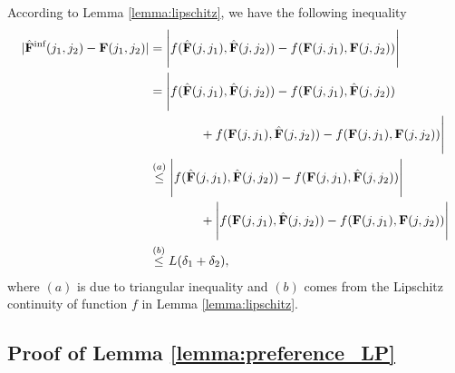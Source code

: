 \documentclass{article} %
\newcommand{\bF}{\mathbf{F}}
\begin{document}
{According to Lemma \ref{lemma:lipschitz}, we have the following inequality
\begin{align}
  |\hat{\bF}^{\text{inf}}(j_1, j_2)-\bF(j_1, j_2)|&=\Bigg|f(\hat{\bF}(j, j_1), \hat{\bF}(j,j_2))-f({\bF}(j, j_1), {\bF}(j,j_2))\Bigg|\nonumber\allowdisplaybreaks\\
  &=   \Bigg|f(\hat{\bF}(j, j_1), \hat{\bF}(j,j_2))-f({\bF}(j, j_1), \hat{\bF}(j,j_2))\nonumber\allowdisplaybreaks\\
  &\qquad\qquad+f({\bF}(j, j_1), \hat{\bF}(j,j_2))-f({\bF}(j, j_1), {\bF}(j,j_2))\Bigg|\nonumber\allowdisplaybreaks\\
  &\overset{(a)}{\leq} \Bigg|f(\hat{\bF}(j, j_1), \hat{\bF}(j,j_2))-f({\bF}(j, j_1), \hat{\bF}(j,j_2))\Bigg|\nonumber\allowdisplaybreaks\\
  &\qquad\qquad+\Bigg|f({\bF}(j, j_1), \hat{\bF}(j,j_2))-f({\bF}(j, j_1), {\bF}(j,j_2))\Bigg|\nonumber\allowdisplaybreaks\\
  &\overset{(b)}{\leq} L(\delta_1+\delta_2),
\end{align}
where $(a)$ is due to triangular inequality and $(b)$ comes from the Lipschitz continuity of function $f$ in Lemma \ref{lemma:lipschitz}.









\subsection{Proof of Lemma \ref{lemma:preference_LP}}

}
\end{document}
